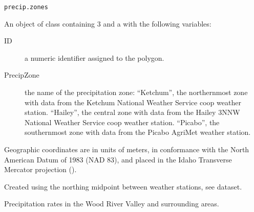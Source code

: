 \documentclass[a4paper]{book}
\begin{document}
%
\begin{Usage}
\begin{verbatim}
precip.zones
\end{verbatim}
\end{Usage}
%
\begin{Format}
An object of  class containing 3  and a  with the following variables:
\begin{description}

\item[ID] a numeric identifier assigned to the polygon.
\item[PrecipZone] the name of the precipitation zone:
``Ketchum'', the northernmost zone with data from the Ketchum National Weather Service coop weather station.
``Hailey'', the central zone with data from the Hailey 3NNW National Weather Service coop weather station.
``Picabo'', the southernmost zone with data from the Picabo AgriMet weather station.


\end{description}

Geographic coordinates are in units of meters, in conformance with the North American Datum of 1983 (NAD 83), and placed in the
Idaho Transverse Mercator projection ().
\end{Format}
%
\begin{Source}\relax
Created using the northing midpoint between weather stations, see  dataset.
\end{Source}
%
\begin{SeeAlso}\relax
{}
\end{SeeAlso}
%
\begin{Examples}
\end{Examples}
%
\begin{Description}\relax
Precipitation rates in the Wood River Valley and surrounding areas.
\end{Description}
\end{document}
